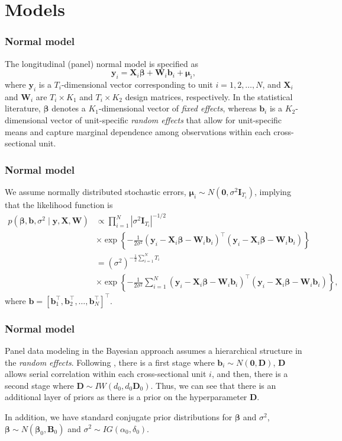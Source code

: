 \documentclass[12pt, compress]{beamer}
\begin{document}
\section{Models}
\begin{frame}
	\frametitle{Normal model}
The longitudinal (panel) normal model is specified as
\[
\bm{y}_i = \bm{X}_i \bm{\beta} + \bm{W}_i \bm{b}_i + \bm{\mu}_i,
\]
where $\bm{y}_i$ is a $T_i$-dimensional vector corresponding to unit $i = 1, 2, \dots, N$, and $\bm{X}_i$ and $\bm{W}_i$ are $T_i \times K_1$ and $T_i \times K_2$ design matrices, respectively. In the statistical literature, $\bm{\beta}$ denotes a $K_1$-dimensional vector of \textit{fixed effects}, whereas $\bm{b}_i$ is a $K_2$-dimensional vector of unit-specific \textit{random effects} that allow for unit-specific means and capture marginal dependence among observations within each cross-sectional unit.
\end{frame}

\begin{frame}
	\frametitle{Normal model}
We assume normally distributed stochastic errors, $\bm{\mu}_i \sim N(\bm{0}, \sigma^2 \bm{I}_{T_i})$, implying that the likelihood function is
{\scriptsize{
\begin{align*}
	p(\bm{\beta}, \bm{b}, \sigma^2 \mid \bm{y}, \bm{X}, \bm{W})
	&\propto
	\prod_{i=1}^N |\sigma^2 \bm{I}_{T_i}|^{-1/2}\\
	&\times
	\exp\!\left\{
	-\frac{1}{2\sigma^2}
	(\bm{y}_i - \bm{X}_i \bm{\beta} - \bm{W}_i \bm{b}_i)^{\top}
	(\bm{y}_i - \bm{X}_i \bm{\beta} - \bm{W}_i \bm{b}_i)
	\right\} \\[3pt]
	&=
	(\sigma^2)^{-\frac{1}{2}\sum_{i=1}^N T_i}\\
	&\times
	\exp\!\left\{
	-\frac{1}{2\sigma^2}
	\sum_{i=1}^N
	(\bm{y}_i - \bm{X}_i \bm{\beta} - \bm{W}_i \bm{b}_i)^{\top}
	(\bm{y}_i - \bm{X}_i \bm{\beta} - \bm{W}_i \bm{b}_i)
	\right\},
\end{align*}
}}
where $\bm{b} = [\bm{b}_1^{\top}, \bm{b}_2^{\top}, \dots, \bm{b}_N^{\top}]^{\top}$.
\end{frame}

\begin{frame}
	\frametitle{Normal model}
Panel data modeling in the Bayesian approach assumes a hierarchical structure in the \textit{random effects}. Following \cite{Chib1999}, there is a first stage where $\bm{b}_i\sim{N}(\bm{0},\bm{D})$, $\bm{D}$ allows serial correlation within each cross-sectional unit $i$, and then, there is a second stage where $\bm{D}\sim{I}{W}(d_0,d_0\bm{D}_0)$. Thus, we can see that there is an additional layer of priors as there is a prior on the hyperparameter $\bm{D}$. 

In addition, we have standard conjugate prior distributions for $\bm{\beta}$ and $\sigma^2$, $\bm{\beta} \sim {N}(\bm{\beta}_0,\bm{B}_0)$ and 
$\sigma^2 \sim {I}{G}(\alpha_0, \delta_0)$. 
\end{frame}
\end{document}
